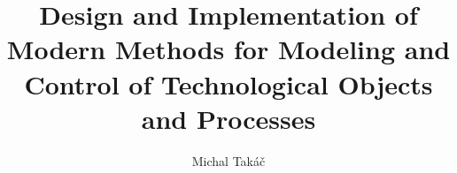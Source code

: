 \documentclass[]{tukethesis}
\author{Michal Takáč}
\title{Design and Implementation of Modern Methods for Modeling and Control of Technological Objects and Processes}
\subtitle{}
\begin{document}
\renewcommand\theHfigure{\theHsection.\arabic{figure}}
\renewcommand\theHtable{\theHsection.\arabic{table}}

\firstpage


\thispagestyle{empty}
\tableofcontents
\newpage

\thispagestyle{empty}
\listoffigures
\newpage

\thispagestyle{empty}
\listoftables
\newpage


%
%
%
\end{document}
